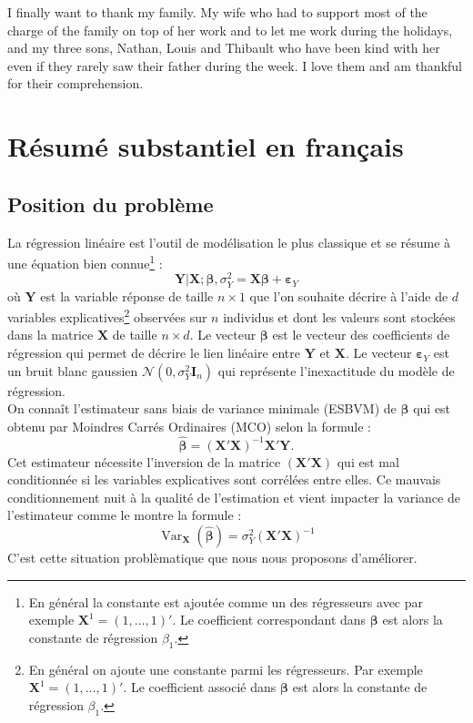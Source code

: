 \documentclass[12pt,a4paper]{report}
\begin{document}
	I finally want to thank my family. My wife who had to support most of the charge of the family on top of her work and to let me work during the holidays, and my three sons, Nathan, Louis and Thibault who have been kind with her even if they rarely saw their father during the week. I love them and am thankful for their comprehension.




\tableofcontents
\chapter{Résumé substantiel en français}
	\section{Position du problème}
	La régression linéaire est l'outil de modélisation le plus classique et se résume à une équation bien connue\footnote{En général la constante est ajoutée comme un des régresseurs avec par exemple $\boldsymbol{X}^1=(1,\ldots,1)'$. Le coefficient correspondant dans $\boldsymbol{\beta}$ est alors la constante de régression $\beta_1$.} :
	\begin{equation}
		\boldsymbol{Y}|\boldsymbol{X};\boldsymbol{\beta},\sigma^2_Y=\boldsymbol{X}\boldsymbol{\beta}+\boldsymbol{\varepsilon}_Y
	\end{equation}
	où $\boldsymbol{Y}$ est la variable réponse de taille $n\times 1$ que l'on souhaite décrire à l'aide de $d$ variables explicatives\footnote{En général on ajoute une constante parmi les régresseurs. Par exemple $\boldsymbol{X}^1=(1,\ldots,1)'$. Le coefficient associé dans $\boldsymbol{\beta}$ est alors la constante de régression $\beta_1$.} observées sur $n$ individus et dont les valeurs sont stockées dans la matrice $\boldsymbol{X}$ de taille $n\times d$. Le vecteur $\boldsymbol{\beta}$ est le vecteur des coefficients de régression qui permet de décrire le lien linéaire entre $\boldsymbol{Y}$ et $\boldsymbol{X}$. Le vecteur $\boldsymbol{\varepsilon}_Y$  est un bruit blanc gaussien $\mathcal{N}(0,\sigma_Y^2\boldsymbol{I}_n)$ qui représente l'inexactitude du modèle de régression.\\
	
	On connaît l'estimateur sans biais de variance minimale (ESBVM) de $\boldsymbol{\beta}$ qui est obtenu par Moindres Carrés Ordinaires (MCO) selon la formule  :
	\begin{equation}
		\hat{\boldsymbol{\beta}}=(\boldsymbol{X}'\boldsymbol{X})^{-1}\boldsymbol{X}'\boldsymbol{Y}.
	\end{equation}
	Cet estimateur nécessite l'inversion de la matrice $(\boldsymbol{X}'\boldsymbol{X})$ qui est mal conditionnée si les variables explicatives sont corrélées entre elles. Ce mauvais conditionnement nuit à la qualité de l'estimation et vient impacter la variance de l'estimateur comme le montre la formule :
	\begin{equation}
		\operatorname{Var}_{\boldsymbol{X}}(\hat{\boldsymbol{\beta}})=\sigma_Y^2(\boldsymbol{X}'\boldsymbol{X})^{-1}
	\end{equation}
	C'est cette situation problèmatique que nous nous proposons d'améliorer.
\end{document}
